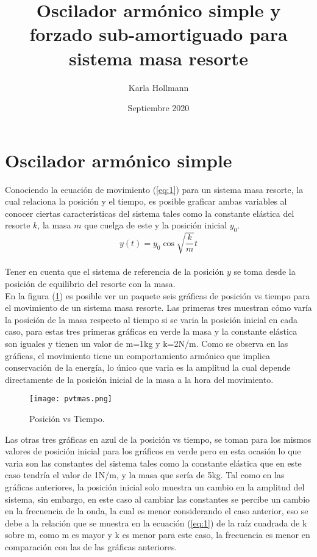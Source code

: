 \documentclass[12pt]{article}
\title{Oscilador armónico simple y forzado sub-amortiguado para sistema masa resorte}
\author{Karla Hollmann}
\date{Septiembre 2020}
\begin{document}
\maketitle

\section{Oscilador armónico simple}

Conociendo la ecuación de movimiento (\ref{eq:1}) para un sistema masa resorte, la cual relaciona la posición y el tiempo, es posible graficar ambas variables al conocer ciertas características del sistema tales como la constante elástica del resorte $k$, la masa $m$ que cuelga de este y la posición inicial $y_{0}$.
\\

 \begin{equation}\label{eq:1}
    y(t)=y_{0}\cos{\sqrt{\frac{k}{m}}t}
 \end{equation}
\\

Tener en cuenta que el sistema de referencia de la posición $y$ se toma desde la posición de equilibrio del resorte con la masa.
\\ 

En la figura (\ref{fig:1}) es posible ver un paquete seis gráficas de posición vs tiempo para el movimiento de un sistema masa resorte. Las primeras tres muestran cómo varía la posición de la masa respecto al tiempo si se varia la posición inicial en cada caso, para estas tres primeras gráficas en verde la masa y la constante elástica son iguales y tienen un valor de m=1kg y k=2N/m. Como se observa en las gráficas, el movimiento tiene un comportamiento armónico que implica conservación de la energía, lo único que varia es la amplitud la cual depende directamente de la posición inicial de la masa a la hora del movimiento.
\\

\begin{figure}[h!]
	\texttt{[image: pvtmas.png]}
	\caption{Posición vs Tiempo.}
	\label{fig:1}
\end{figure}


Las otras tres gráficas en azul de la posición vs tiempo, se toman para los mismos valores de posición inicial para los gráficos en verde pero en esta ocasión lo que varia son las constantes del sistema tales como la constante elástica que en este caso tendría el valor de 1N/m, y la masa que sería de 5kg. Tal como en las gráficas anteriores, la posición inicial solo muestra un cambio en la amplitud del sistema, sin embargo, en este caso al cambiar las constantes se percibe un cambio en la frecuencia de la onda, la cual es menor considerando el caso anterior, eso se debe a la relación que se muestra en la ecuación (\ref{eq:1}) de la raíz cuadrada de k sobre m, como m es mayor y k es menor para este caso, la frecuencia es menor en comparación con las de las gráficas anteriores.
\\
\end{document}
